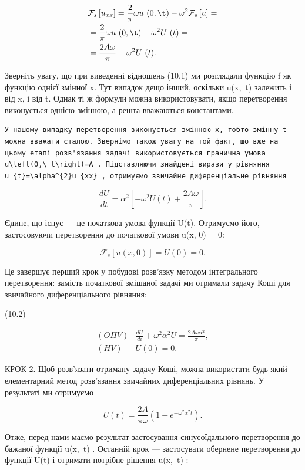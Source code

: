 \documentclass[
  ukrainian,
]{article}
\begin{document}
\[
\begin{split} &\mathcal{F}_s\left[u_{xx}\right] = \frac{2}{\pi} \omega u \ (0, \t) - \omega^2 \mathcal{F}_s\left[u\right] = \\ &= \frac{2}{\pi} \omega u \ (0, \t) - \omega^2 U \ (t) = \\ &= \frac{2A\omega}{\pi} - \omega^2 U \ (t). \end{split}
\]

Зверніть увагу, що при виведенні відношень (10.1) ми розглядали функцію
f як функцію однієї змінної x. Тут випадок дещо інший, оскільки
u\left(x,~t\right) залежить і від x, і від t. Однак ті ж формули можна
використовувати, якщо перетворення виконується однією змінною, а решта
вважаються константами.

\begin{verbatim}
У нашому випадку перетворення виконується змінною x, тобто змінну t можна вважати сталою. Звернімо також увагу на той факт, що вже на цьому етапі розв'язання задачі використовується гранична умова u\left(0,\ t\right)=A . Підставляючи знайдені вирази у рівняння u_{t}=\alpha^{2}u_{xx} , отримуємо звичайне диференціальне рівняння
\end{verbatim}

\[
\frac{dU}{dt} = \alpha^2 \left[ -\omega^2 U(t) + \frac{2A\omega}{\pi} \right].
\]

Єдине, що існує --- це початкова умова функції U(t). Отримуємо його,
застосовуючи перетворення до початкової умови u(x, 0) = 0:

\[
\mathcal{F}_{s}[u(x, 0)] = U(0) = 0.
\]

Це завершує перший крок у побудові розв'язку методом інтегрального
перетворення: замість початкової змішаної задачі ми отримали задачу Коші
для звичайного диференціального рівняння:

(10.2)

\[
\begin{aligned} (O \Pi V) & \frac{dU}{di} + \omega^2 \alpha^2 U = \frac{2A\omega \alpha^2}{\pi}, \\ (H V) & U(0) = 0. \end{aligned}
\]

КРОК 2. Щоб розв'язати отриману задачу Коші, можна використати будь-який
елементарний метод розв'язання звичайних диференціальних рівнянь. У
результаті ми отримуємо

\[
U(t) = \frac{2A}{\pi\omega} (1 - e^{-\omega^2 \alpha^2 t}).
\]

Отже, перед нами маємо результат застосування синусоїдального
перетворення до бажаної функції u\left(x,~t\right) . Останній крок ---
застосувати обернене перетворення до функції U\left(t\right) і отримати
потрібне рішення u\left(x,~t\right) :
\end{document}
